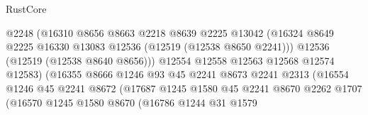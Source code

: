 \begin{lexlean}{RustCore}
\begin{coremodule}
                                        @2248
                                        (@16310
                                          @8656
                                          @8663
                                          @2218
                                          @8639
                                          @2225
                                          @13042
                                          (@16324
                                            @8649
                                            @2225
                                            @16330
                                            @13083
                                            @12536
                                            (@12519 (@12538 @8650 @2241)))
                                          @12536
                                          (@12519 (@12538 @8640 @8656)))
                                        @12554
                                        @12558
                                        @12563
                                        @12568
                                        @12574
                                        @12583)
                                      (@16355
                                        @8666
                                        @1246
                                        @93
                                        @45
                                        @2241
                                        @8673
                                        @2241
                                        @2313
                                        (@16554
                                          @1246
                                          @45
                                          @2241
                                          @8672
                                          (@17687
                                            @1245
                                            @1580
                                            @45
                                            @2241
                                            @8670
                                            @2262
                                            @1707
                                            (@16570
                                              @1245
                                              @1580
                                              @8670
                                              (@16786
                                                @1244
                                                @31
                                                @1579

\end{coremodule}
\end{lexlean}
